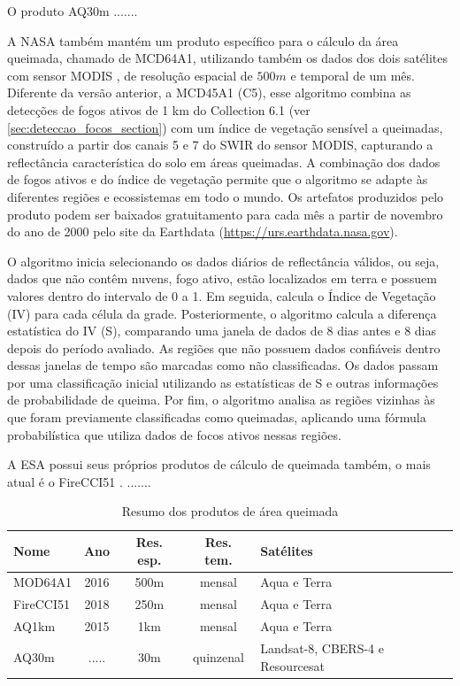 \documentclass[cic,tc]{iiufrgs}
\begin{document}
O produto AQ30m .......

A NASA também mantém um produto específico para o cálculo da área queimada, chamado de MCD64A1, utilizando também os dados dos dois satélites com sensor MODIS \citep{GIGLIO201872}, de resolução espacial de $500m$ e temporal de um mês. Diferente da versão anterior, a MCD45A1 (C5), esse algoritmo combina as detecções de fogos ativos de 1 km do Collection 6.1 (ver \ref{sec:deteccao_focos_section}) com um índice de vegetação sensível a queimadas, construído a partir dos canais 5 e 7 do SWIR do sensor MODIS, capturando a reflectância característica do solo em áreas queimadas. A combinação dos dados de fogos ativos e do índice de vegetação permite que o algoritmo se adapte às diferentes regiões e ecossistemas em todo o mundo. Os artefatos produzidos pelo produto podem ser baixados gratuitamento para cada mês a partir de novembro do ano de 2000 pelo site da Earthdata (\url{https://urs.earthdata.nasa.gov}).

O algoritmo inicia selecionando os dados diários de reflectância válidos, ou seja, dados que não contêm nuvens, fogo ativo, estão localizados em terra e possuem valores dentro do intervalo de 0 a 1. Em seguida, calcula o Índice de Vegetação (IV) para cada célula da grade. Posteriormente, o algoritmo calcula a diferença estatística do IV (S), comparando uma janela de dados de 8 dias antes e 8 dias depois do período avaliado. As regiões que não possuem dados confiáveis dentro dessas janelas de tempo são marcadas como não classificadas. Os dados passam por uma classificação inicial utilizando as estatísticas de S e outras informações de probabilidade de queima. Por fim, o algoritmo analisa as regiões vizinhas às que foram previamente classificadas como queimadas, aplicando uma fórmula probabilística que utiliza dados de focos ativos nessas regiões.

A ESA possui seus próprios produtos de cálculo de queimada também, o mais atual é o FireCCI51 \citep{Lizundia2020}. .......

\begin{table}[htbp]
\centering
\caption{Resumo dos produtos de área queimada}
\begin{tabular}{ @{}lcccl@{} }
  \toprule
  Nome    & Ano & Res. esp. & Res. tem. & Satélites \\
  \midrule
  MOD64A1 & 2016  & 500m & mensal & Aqua e Terra \\
  FireCCI51 & 2018 & 250m & mensal & Aqua e Terra \\
  AQ1km & 2015 & 1km & mensal & Aqua e Terra \\
  AQ30m & ..... & 30m & quinzenal & Landsat-8, CBERS-4 e Resourcesat \\
  \bottomrule
\end{tabular}
\label{table:resumo_produtos_area_queimada}
\end{table}
\end{document}
